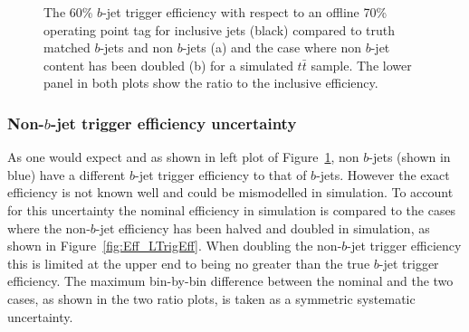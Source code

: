 \begin{figure}[!ht]
  \begin{center}
    \captionsetup[subfigure]{aboveskip=0pt,justification=centering}
  \end{center}
  \caption{The 60\% $b$-jet trigger efficiency with respect to an offline 70\% operating point tag
    for inclusive jets (black) compared to truth matched $b$-jets and non $b$-jets (a) and the case where non $b$-jet content has been doubled (b) for a simulated $t\bar{t}$ sample.
    The lower panel in both plots show the ratio to the inclusive efficiency.
  }
  \label{fig:Eff_Purity}
\end{figure}

\subsubsection{Non-$b$-jet trigger efficiency uncertainty}
\label{sec:trig-lightTrigEff}

As one would expect and as shown in left plot of Figure~\ref{fig:Eff_Purity}, non $b$-jets (shown in blue) have a different $b$-jet trigger efficiency to that of $b$-jets.
However the exact efficiency is not known well and could be mismodelled in simulation.
To account for this uncertainty the nominal efficiency in simulation is compared
to the cases where the non-$b$-jet efficiency has been halved and doubled in simulation, as shown in Figure~\ref{fig:Eff_LTrigEff}.
When doubling the non-$b$-jet trigger efficiency this is limited at the upper end to being no greater than the true $b$-jet trigger efficiency.
The maximum bin-by-bin difference between the nominal and the two cases, as shown in the two ratio plots, is taken as a symmetric systematic uncertainty.

